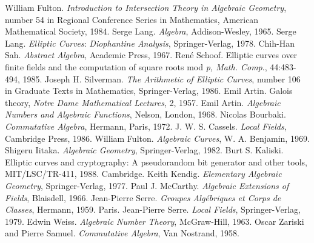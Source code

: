\begin{thebibliography}{9}
 William Fulton. {\it Introduction to Intersection Theory in Algebraic Geometry}, number 54 in Regional Conference Series in Mathematics, American Mathematical Society, 1984.
 Serge Lang. {\it Algebra}, Addison-Wesley, 1965.
 Serge Lang. {\it Elliptic Curves}: {\it Diophantine Analysis}, Springer-Verlag, 1978.
 Chih-Han Sah. {\it Abstract Algebra}, Academic Press, 1967.
 Ren\'{e} Schoof. Elliptic curves over finite fields and the computation of square roots mod {\it p, Math. Comp}., 44:483-494, 1985.
 Joseph H. Silverman. {\it The Arithmetic of Elliptic Curves}, number 106 in Graduate Texts in Mathematics, Springer-Verlag, 1986.
 Emil Artin. Galois theory, {\it Notre Dame Mathematical Lectures}, 2, 1957.
 Emil Artin. {\it Algebraic Numbers and Algebraic Functions}, Nelson, London, 1968.
 Nicolas Bourbaki. {\it Commutative Algebra}, Hermann, Paris, 1972.
 J. W. S. Cassels. {\it Local Fields}, Cambridge Press, 1986.
 William Fulton. {\it Algebraic Curves}, W. A. Benjamin, 1969.
 Shigeru Iitaka. {\it Algebraic Geometry}, Springer-Verlag, 1982.
 Burt S. Kaliski. Elliptic curves and cryptography: A pseudorandom bit generator and other tools, MIT/LSC/TR-411, 1988. Cambridge.
 Keith Kendig. {\it Elementary Algebraic Geometry}, Springer-Verlag, 1977.
 Paul J. McCarthy. {\it Algebraic Extensions of Fields}, Blaisdell, 1966.
 Jean-Pierre Serre. {\it Groupes Alg\'{e}briques et Corps de Classes}, Hermann, 1959. Paris.
 Jean-Pierre Serre. {\it Local Fields}, Springer-Verlag, 1979.
 Edwin Weiss. {\it Algebraic Number Theory}, McGraw-Hill, 1963.
 Oscar Zariski and Pierre Samuel. {\it Commutative Algebra}, Van Nostrand, 1958.
\end{thebibliography}




